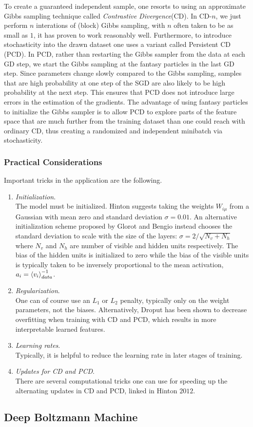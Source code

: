 To create a guaranteed independent sample, one resorts to using an approximate Gibbs sampling technique called \emph{Contrastive Divergence}(CD). In CD-$n$, we just perform $n$ interations of (block) Gibbs sampling, with $n$ often taken to be as small as $1$, it has proven to work reasonably well. Furthermore, to introduce stochasticity into the drawn dataset one uses a variant called Persistent CD (PCD). In PCD, rather than restarting the Gibbs sampler from the data at each GD step, we start the Gibbs sampling at the fantasy particles in the last GD step. Since parameters change slowly compared to the Gibbs sampling, samples that are high probability at one step of the SGD are also likely to be high probability at the next step. This ensures that PCD does not introduce large errors in the estimation of the gradients. The advantage of using fantasy particles to initialize the Gibbs sampler is to allow PCD to explore parts of the feature space that are much further from the training dataset than one could reach with ordinary CD, thus creating a randomized and independent minibatch via stochasticity.

\subsubsection{Practical Considerations}
\label{subsubsec:deepGenerativeTrainingPractical}
Important tricks in the application are the following.
\begin{enumerate}
	\item \emph{Initialization}.\\
	The model must be initialized. Hinton suggests taking the weights $W_{i\mu}$ from a Gaussian with mean zero and standard deviation $\sigma=0.01$. An alternative initialization scheme proposed by Glorot and Bengio instead chooses the standard deviation to scale with the size of the layers: $\sigma = 2/\sqrt{N_v+N_h}$ where $N_v$ and $N_h$ are number of visible and hidden units respectively. The bias of the hidden units is initialized to zero while the bias of the visible units is typically taken to be inversely proportional to the mean activation, $a_i=\expval{v_i}^{-1}_{data}$.
	\item \emph{Regularization}.\\
	One can of course use an $L_1$ or $L_2$ penalty, typically only on the weight parameters, not the biases. Alternatively, Droput has been shown to decrease overfitting when training with CD and PCD, which results in more interpretable learned features.
	\item  \emph{Learning rates}.\\
	Typically, it is helpful to reduce the learning rate in later stages of training.
	\item \emph{Updates for CD and PCD}.\\
	There are several computational tricks one can use for speeding up the alternating updates in CD and PCD, linked in Hinton $2012$.
\end{enumerate}




\subsection{Deep Boltzmann Machine}
\label{subsec:deepGenerativeDBM}


 